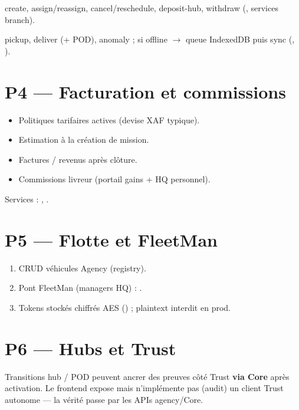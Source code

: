 \begin{description}[style=nextline]
  \item[HQ / Antenne]
    create, assign/reassign, cancel/reschedule, deposit-hub, withdraw
    (, services branch).
  \item[Livreur]
    pickup, deliver (+ POD), anomaly ; si offline $\rightarrow$ queue IndexedDB
    puis sync (, ).
\end{description}

\section{P4 --- Facturation et commissions}

\begin{itemize}
  \item Politiques tarifaires actives (devise XAF typique).
  \item Estimation à la création de mission.
  \item Factures / revenus après clôture.
  \item Commissions livreur (portail gains + HQ personnel).
\end{itemize}
Services : , .

\section{P5 --- Flotte et FleetMan}

\begin{enumerate}
  \item CRUD véhicules Agency (registry).
  \item Pont FleetMan (managers HQ) :
        .
  \item Tokens stockés chiffrés AES
        () ;
        plaintext interdit en prod.
\end{enumerate}

\section{P6 --- Hubs et Trust}

Transitions hub / POD peuvent ancrer des preuves côté Trust \textbf{via Core}
après activation. Le frontend expose
 mais n'implémente pas (audit) un
client Trust autonome --- la vérité passe par les APIs agency/Core.
